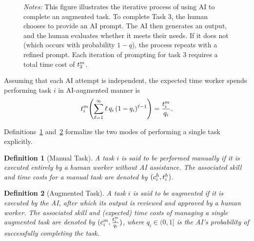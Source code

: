 \documentclass{article}
\theoremstyle{plain}
\theoremstyle{plain}
\newtheorem{definition}{Definition}
\begin{document}
\begin{figure}[h!]
\begin{center}
{}
   \end{center}
  \footnotesize{
  \emph{Notes:} This figure illustrates the iterative process of using AI to complete an augmented task.  
  To complete Task 3, the human 
  chooses to
  provide an AI prompt. 
  The AI then generates an output, and the human evaluates whether it meets their needs. 
  If it does not (which occurs with probability $1-q$), the process repeats with a refined prompt.  
  Each iteration of prompting for task 3 requires a total time cost of $t^{m}_{3}$.
  }
\end{figure}
Assuming that each AI attempt is independent, the expected time worker spends performing task $i$ in AI-augmented manner is
$$t^{m}_{i} \Biggl( \sum_{\ell=1}^{\infty} \ell\,q_i\,(1 - q_i)^{\ell - 1} \Biggr) = \frac{t^{m}_{i}}{q_i}.$$

Definitions~\ref{def:manual_task} and~\ref{def:augmented_task} formalize the two modes of performing a single task explicitly.

\begin{definition}[Manual Task]
\label{def:manual_task}
A task $i$ is said to be performed manually if it is executed entirely by a human worker without AI assistance.
The associated skill and time costs for a manual task are denoted by $(c^{h}_{i}, t^{h}_{i})$.
\end{definition}

\begin{definition}[Augmented Task]
\label{def:augmented_task}
A task $i$ is said to be augmented if it is executed by the AI, after which its output is reviewed and approved by a human worker.
The associated skill and (expected) time costs of managing a single augmented task are denoted by $(c^{m}_{i}, \frac{t^{m}_{i}}{q_i})$, where $q_i \in (0,1]$ is the AI's probability of successfully completing the task.
\end{definition}
\end{document}
